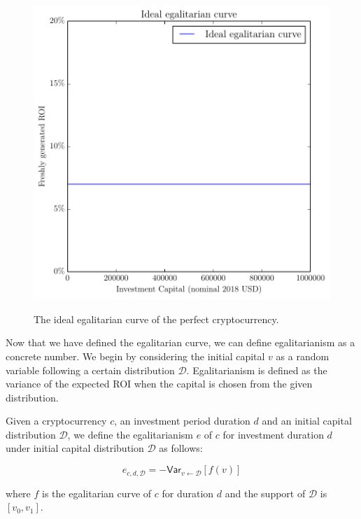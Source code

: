 \begin{figure}[H]
    \caption{The ideal egalitarian curve of the perfect cryptocurrency.}
    \centering
    \includegraphics[width=0.75 \columnwidth,keepaspectratio]{figures/ideal.pdf}
    \label{fig:ideal}
\end{figure}

Now that we have defined the egalitarian curve, we can define egalitarianism
as a concrete number. We begin by considering the initial capital $v$ as a
random variable following a certain distribution $\mathcal{D}$. Egalitarianism
is defined as the variance of the expected ROI when the capital is chosen from
the given distribution.

\begin{definition}[Egalitarianism]
  Given a cryptocurrency $c$, an investment period duration $d$ and an initial
  capital distribution $\mathcal{D}$, we define the egalitarianism $e$ of $c$
  for investment duration $d$ under initial capital distribution $\mathcal{D}$
  as follows:

  \[
    e_{c,d,\mathcal{D}} = -\textsf{Var}_{v \gets \mathcal{D}}[f(v)]
  \]

  where $f$ is the egalitarian curve of $c$ for duration $d$ and the support of
  $\mathcal{D}$ is $[v_0, v_1]$.
\end{definition}
